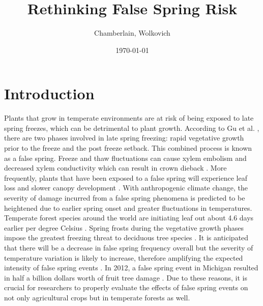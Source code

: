 \documentclass{article}\usepackage[]{graphicx}\usepackage[]{color}
\begin{document}
\title{Rethinking False Spring Risk}
\author{Chamberlain, Wolkovich}
\date{\today}
\maketitle 
\newpage
\tableofcontents
\listoffigures
\listoftables

\renewcommand{\thetable}{\arabic{table}}
\renewcommand{\thefigure}{\arabic{figure}}
\renewcommand{\labelitemi}{$-$}

\newpage
\section{Introduction}
Plants that grow in temperate environments are at risk of being exposed to late spring freezes, which can be detrimental to plant growth. According to Gu et al. %
, there are two phases involved in late spring freezing: rapid vegetative growth prior to the freeze and the post freeze setback. This combined process is known as a false spring. Freeze and thaw fluctuations can cause xylem embolism and decreased xylem conductivity which can result in crown dieback \citep{Gu2008}.
More frequently, plants that have been exposed to a false spring will experience leaf loss and slower canopy development \citep{Hufkens2012}. 
With anthropogenic climate change, the severity of damage incurred from a false spring phenomena is predicted to be heightened due to earlier spring onset and greater fluctuations in temperatures. Temperate forest species around the world are initiating leaf out about 4.6 days earlier per degree Celsius \citep{Polgar2014, Wolkovich2012}. Spring frosts during the vegetative growth phases impose the greatest freezing threat to deciduous tree species \citep{Sakai1987}. It is anticipated that there will be a decrease in false spring frequency overall but the severity of temperature variation is likely to increase, therefore amplifying the expected intensity of false spring events \citep{Allstadt2015}. In 2012, a false spring event in Michigan resulted in half a billion dollars worth of fruit tree damage \citep{Ault2013, Knudson2012}. Due to these reasons, it is crucial for researchers to properly evaluate the effects of false spring events on not only agricultural crops but in temperate forests as well.
\end{document}

